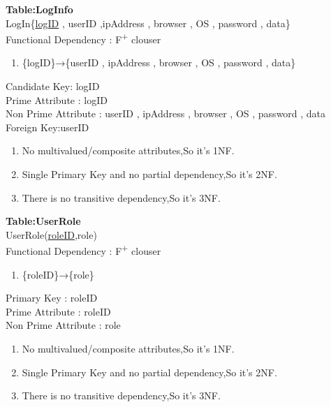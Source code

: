 \noindent 
\textbf{Table:LogInfo}\\
LogIn\{\underline{logID} , userID ,ipAddress , browser , OS , password , data\}\\
\newline
Functional Dependency : F\textsuperscript{+} clouser
\begin{enumerate}
\item 
 
\{logID\}→\{userID , ipAddress , browser , OS , password , data\}
\end{enumerate}
Candidate Key: logID\\
Prime Attribute : logID\\
Non Prime Attribute : userID , ipAddress , browser , OS , password , data\\
Foreign Key:userID\\
 
\begin{enumerate}
\item No multivalued/composite attributes,So it's 1NF.
\item Single Primary Key and no partial dependency,So it's 2NF.
\item There is no transitive dependency,So it's 3NF.\\
\end{enumerate}

\newpage
\noindent
\textbf{Table:UserRole}\\
UserRole(\underline{roleID},role)\\
\newline
Functional Dependency : F\textsuperscript{+} clouser 
\begin{enumerate}
\item 
\{roleID\}→\{role\}
\end{enumerate}
Primary Key : roleID\\
Prime Attribute : roleID\\
Non Prime Attribute : role\\
\begin{enumerate}
\item No multivalued/composite attributes,So it's 1NF.
\item Single Primary Key and no partial dependency,So it's 2NF.
\item There is no transitive dependency,So it's 3NF.\\
\end{enumerate}


